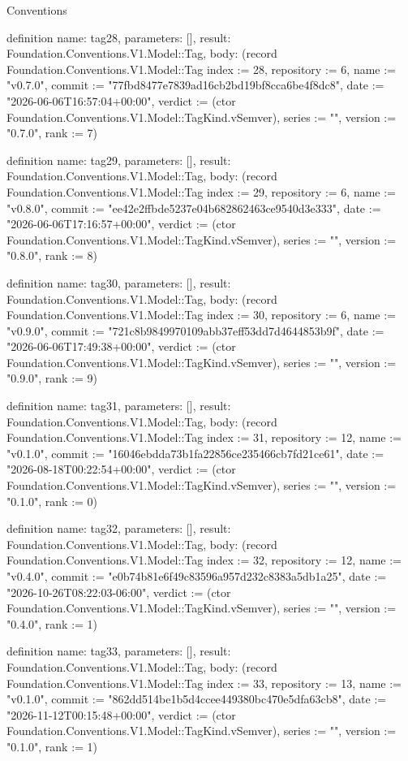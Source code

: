 \begin{lexlean}{Conventions}
\begin{semanticmodule}
definition{
  name: tag28,
  parameters: [],
  result: Foundation.Conventions.V1.Model::Tag,
  body: (record Foundation.Conventions.V1.Model::Tag {index := 28, repository := 6, name := "v0.7.0", commit := "77fbd8477e7839ad16cb2bd19bf8cca6be4f8dc8", date := "2026-06-06T16:57:04+00:00", verdict := (ctor Foundation.Conventions.V1.Model::TagKind.vSemver), series := "", version := "0.7.0", rank := 7})
}

definition{
  name: tag29,
  parameters: [],
  result: Foundation.Conventions.V1.Model::Tag,
  body: (record Foundation.Conventions.V1.Model::Tag {index := 29, repository := 6, name := "v0.8.0", commit := "ee42e2ffbde5237e04b682862463ce9540d3e333", date := "2026-06-06T17:16:57+00:00", verdict := (ctor Foundation.Conventions.V1.Model::TagKind.vSemver), series := "", version := "0.8.0", rank := 8})
}

definition{
  name: tag30,
  parameters: [],
  result: Foundation.Conventions.V1.Model::Tag,
  body: (record Foundation.Conventions.V1.Model::Tag {index := 30, repository := 6, name := "v0.9.0", commit := "721c8b9849970109abb37eff53dd7d4644853b9f", date := "2026-06-06T17:49:38+00:00", verdict := (ctor Foundation.Conventions.V1.Model::TagKind.vSemver), series := "", version := "0.9.0", rank := 9})
}

definition{
  name: tag31,
  parameters: [],
  result: Foundation.Conventions.V1.Model::Tag,
  body: (record Foundation.Conventions.V1.Model::Tag {index := 31, repository := 12, name := "v0.1.0", commit := "16046ebdda73b1fa22856ce235466cb7fd21ce61", date := "2026-08-18T00:22:54+00:00", verdict := (ctor Foundation.Conventions.V1.Model::TagKind.vSemver), series := "", version := "0.1.0", rank := 0})
}

definition{
  name: tag32,
  parameters: [],
  result: Foundation.Conventions.V1.Model::Tag,
  body: (record Foundation.Conventions.V1.Model::Tag {index := 32, repository := 12, name := "v0.4.0", commit := "e0b74b81e6f49c83596a957d232c8383a5db1a25", date := "2026-10-26T08:22:03-06:00", verdict := (ctor Foundation.Conventions.V1.Model::TagKind.vSemver), series := "", version := "0.4.0", rank := 1})
}

definition{
  name: tag33,
  parameters: [],
  result: Foundation.Conventions.V1.Model::Tag,
  body: (record Foundation.Conventions.V1.Model::Tag {index := 33, repository := 13, name := "v0.1.0", commit := "862dd514be1b5d4ccee449380bc470e5dfa63cb8", date := "2026-11-12T00:15:48+00:00", verdict := (ctor Foundation.Conventions.V1.Model::TagKind.vSemver), series := "", version := "0.1.0", rank := 1})
}


\end{semanticmodule}
\end{lexlean}

